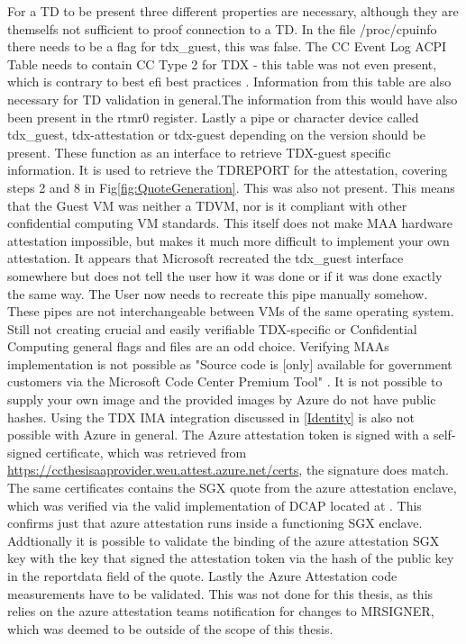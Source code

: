 \label{Issues-with-azure-td}
For a TD to be present three different properties are necessary, although they are themselfs not sufficient to proof connection to a TD. In the file /proc/cpuinfo there needs to be a flag for tdx\_guest, this was false. The CC Event Log ACPI Table needs to contain CC Type 2 for TDX - this table was not even present, which is contrary to best efi best practices \cite{uefi_forum_inc_acpi_docu_2022}. Information from this table are also necessary for TD validation in general.The information from this would have also been present in the rtmr0 register. Lastly a pipe or character device called tdx\_guest, tdx-attestation or tdx-guest depending on the version should be present. These function as an interface to retrieve TDX-guest specific information\cite{linux_kernel_development_community_tdx_2024}. It is used to retrieve the TDREPORT for the attestation, covering steps 2 and 8 in Fig\ref{fig:QuoteGeneration}.  This was also not present. This means that the Guest VM was neither a TDVM, nor is it compliant with other confidential computing VM standards. This itself does not make MAA hardware attestation impossible, but makes it much more difficult to implement your own attestation. It appears that Microsoft recreated the tdx\_guest interface somewhere but does not tell the user how it was done or if it was done exactly the same way. The User now needs to recreate this pipe manually somehow. These pipes are not interchangeable between VMs of the same operating system. Still not creating crucial and easily verifiable TDX-specific or Confidential Computing general flags and files are an odd choice.
Verifying MAAs implementation is not possible as "Source code is [only] available for government customers via the Microsoft Code Center Premium Tool" \cite{dan_mabee_azure_attestation_2023}. It is not possible to supply your own image and the provided images by Azure do not have public hashes. Using the TDX IMA integration discussed in \ref{Identity} is also not possible with Azure in general.
The Azure attestation token is signed with a self-signed certificate, which was retrieved from \url{https://ccthesisaaprovider.weu.attest.azure.net/certs}, the signature does match. The same certificates contains the SGX quote from the azure attestation enclave, which was verified via the valid implementation of DCAP located at \cite{azure_samples}. This confirms just that azure attestation runs inside a functioning SGX enclave. Addtionally it is possible to validate the binding of the azure attestation SGX key with the key that signed the attestation token via the hash of the public key in the reportdata field of the quote. Lastly the Azure Attestation code measurements have to be validated. This was not done for this thesis, as this relies on the azure attestation teams notification for changes to MRSIGNER, which was deemed to be outside of the scope of this thesis.

